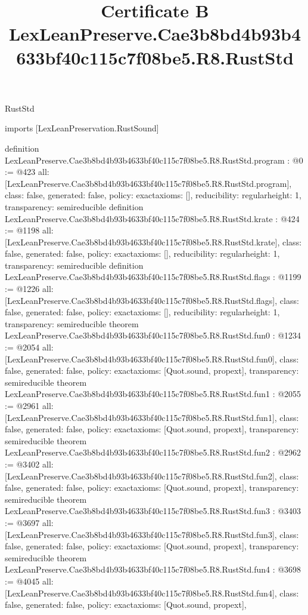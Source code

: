 \begin{lexlean}{RustStd}
\title{Certificate B LexLeanPreserve.Cae3b8bd4b93b4633bf40c115c7f08be5.R8.RustStd}
\begin{coremodule}
imports [LexLeanPreservation.RustSound]

definition LexLeanPreserve.Cae3b8bd4b93b4633bf40c115c7f08be5.R8.RustStd.program : @0 := @423 {
  all: [LexLeanPreserve.Cae3b8bd4b93b4633bf40c115c7f08be5.R8.RustStd.program],
  class: false,
  generated: false,
  policy: exact{axioms: []},
  reducibility: regular{height: 1},
  transparency: semireducible
}
definition LexLeanPreserve.Cae3b8bd4b93b4633bf40c115c7f08be5.R8.RustStd.krate : @424 := @1198 {
  all: [LexLeanPreserve.Cae3b8bd4b93b4633bf40c115c7f08be5.R8.RustStd.krate],
  class: false,
  generated: false,
  policy: exact{axioms: []},
  reducibility: regular{height: 1},
  transparency: semireducible
}
definition LexLeanPreserve.Cae3b8bd4b93b4633bf40c115c7f08be5.R8.RustStd.flags : @1199 := @1226 {
  all: [LexLeanPreserve.Cae3b8bd4b93b4633bf40c115c7f08be5.R8.RustStd.flags],
  class: false,
  generated: false,
  policy: exact{axioms: []},
  reducibility: regular{height: 1},
  transparency: semireducible
}
theorem LexLeanPreserve.Cae3b8bd4b93b4633bf40c115c7f08be5.R8.RustStd.fun0 : @1234 := @2054 {
  all: [LexLeanPreserve.Cae3b8bd4b93b4633bf40c115c7f08be5.R8.RustStd.fun0],
  class: false,
  generated: false,
  policy: exact{axioms: [Quot.sound, propext]},
  transparency: semireducible
}
theorem LexLeanPreserve.Cae3b8bd4b93b4633bf40c115c7f08be5.R8.RustStd.fun1 : @2055 := @2961 {
  all: [LexLeanPreserve.Cae3b8bd4b93b4633bf40c115c7f08be5.R8.RustStd.fun1],
  class: false,
  generated: false,
  policy: exact{axioms: [Quot.sound, propext]},
  transparency: semireducible
}
theorem LexLeanPreserve.Cae3b8bd4b93b4633bf40c115c7f08be5.R8.RustStd.fun2 : @2962 := @3402 {
  all: [LexLeanPreserve.Cae3b8bd4b93b4633bf40c115c7f08be5.R8.RustStd.fun2],
  class: false,
  generated: false,
  policy: exact{axioms: [Quot.sound, propext]},
  transparency: semireducible
}
theorem LexLeanPreserve.Cae3b8bd4b93b4633bf40c115c7f08be5.R8.RustStd.fun3 : @3403 := @3697 {
  all: [LexLeanPreserve.Cae3b8bd4b93b4633bf40c115c7f08be5.R8.RustStd.fun3],
  class: false,
  generated: false,
  policy: exact{axioms: [Quot.sound, propext]},
  transparency: semireducible
}
theorem LexLeanPreserve.Cae3b8bd4b93b4633bf40c115c7f08be5.R8.RustStd.fun4 : @3698 := @4045 {
  all: [LexLeanPreserve.Cae3b8bd4b93b4633bf40c115c7f08be5.R8.RustStd.fun4],
  class: false,
  generated: false,
  policy: exact{axioms: [Quot.sound, propext]},
}
\end{coremodule}
\end{lexlean}
